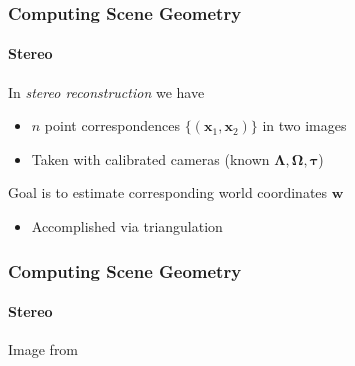 \documentclass[xetex,professionalfont]{beamer}
\renewcommand{\vec}[1]{\ensuremath{\mathbf{#1}}}
\newcommand{\vw}{\vec{w}}
\newcommand{\vx}{\vec{x}}
\newcommand{\intr}{\boldsymbol{\Lambda}}
\begin{document}

\begin{frame}
\frametitle{Computing Scene Geometry}
\framesubtitle{Stereo}

In \emph{stereo reconstruction} we have
\begin{itemize}
    \item $n$ point correspondences $\{(\vx_1,\vx_2)\}$ in two images %
    \item Taken with calibrated cameras (known $\intr, \boldsymbol{\Omega}, \boldsymbol{\tau}$)
\end{itemize}

\bigskip
Goal is to estimate corresponding world coordinates $\vw$
\begin{itemize}
    \item Accomplished via triangulation
\end{itemize}

\end{frame}


\begin{frame}
\frametitle{Computing Scene Geometry}
\framesubtitle{Stereo}

\begin{center}
    {\centering Image from \cite{prince12}}
\end{center}

\end{frame}

\end{document}
